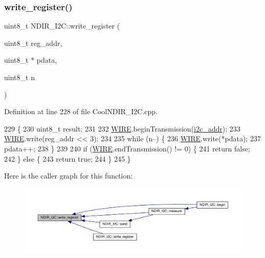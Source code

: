 \subsubsection{\texorpdfstring{write\+\_\+register()}{write\_register()}\hspace{0.1cm}{\footnotesize\ttfamily [1/2]}}
{\footnotesize\ttfamily uint8\+\_\+t N\+D\+I\+R\+\_\+\+I2\+C\+::write\+\_\+register (\begin{DoxyParamCaption}\item[{uint8\+\_\+t}]{reg\+\_\+addr,  }\item[{uint8\+\_\+t $\ast$}]{pdata,  }\item[{uint8\+\_\+t}]{n }\end{DoxyParamCaption})\hspace{0.3cm}{\ttfamily [private]}}



Definition at line 228 of file Cool\+N\+D\+I\+R\+\_\+\+I2\+C.\+cpp.


\begin{DoxyCode}
229 \{
230     uint8\_t result;
231 
232     \hyperlink{_cool_n_d_i_r___i2_c_8cpp_a5fb65319d8f31c75826267805bb435d1}{WIRE}.beginTransmission(\hyperlink{class_n_d_i_r___i2_c_aac12069dd5a86a9ec6aa31ac9a44aabe}{i2c\_addr});
233     \hyperlink{_cool_n_d_i_r___i2_c_8cpp_a5fb65319d8f31c75826267805bb435d1}{WIRE}.write(reg\_addr << 3);
234 
235     \textcolor{keywordflow}{while} (n--) \{
236         \hyperlink{_cool_n_d_i_r___i2_c_8cpp_a5fb65319d8f31c75826267805bb435d1}{WIRE}.write(*pdata);
237         pdata++;
238     \}
239 
240     \textcolor{keywordflow}{if} (\hyperlink{_cool_n_d_i_r___i2_c_8cpp_a5fb65319d8f31c75826267805bb435d1}{WIRE}.endTransmission() != 0) \{
241         \textcolor{keywordflow}{return} \textcolor{keyword}{false};
242     \} \textcolor{keywordflow}{else} \{
243         \textcolor{keywordflow}{return} \textcolor{keyword}{true};
244     \}
245 \}
\end{DoxyCode}
Here is the caller graph for this function\+:\nopagebreak
\begin{figure}[H]
\begin{center}
\leavevmode
\includegraphics[width=350pt]{d6/ddb/class_n_d_i_r___i2_c_a5de6a044b00e985f035edca07521e319_icgraph}
\end{center}
\end{figure}
\mbox{\label{class_n_d_i_r___i2_c_a8ad2a76f9866b0a1f34810a147b4b20d}} 
